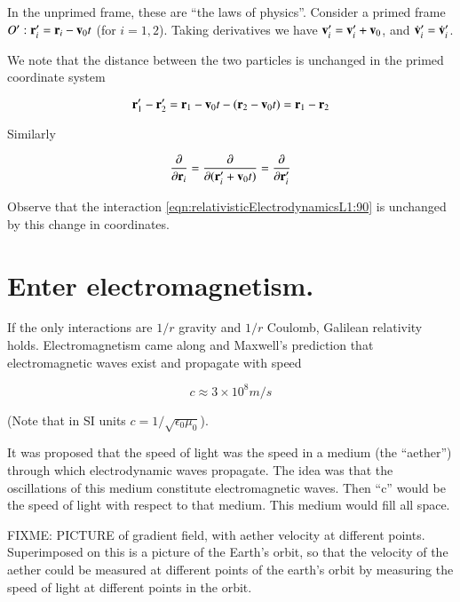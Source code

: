 In the unprimed frame, these are ``the laws of physics''.  Consider a primed frame $O' : \mathbf{r}_i' = \mathbf{r}_i - \mathbf{v}_0 t$ (for $i=1,2$).  Taking derivatives we have $\mathbf{v}_i' = \mathbf{v}_i' + \mathbf{v}_0$, and $\dot{\mathbf{v}}_i' = \dot{\mathbf{v}}_i'$.

We note that the distance between the two particles is unchanged in the primed coordinate system

\begin{equation}\label{eqn:relativisticElectrodynamicsL1:100}
\mathbf{r}_1' - \mathbf{r}_2' = \mathbf{r}_1 - \mathbf{v}_0 t -( \mathbf{r}_2 - \mathbf{v}_0 t ) = \mathbf{r}_1 - \mathbf{r}_2
\end{equation}

Similarly 

\begin{equation}\label{eqn:relativisticElectrodynamicsL1:110}
\frac{\partial {}}{\partial {\mathbf{r}_i}} = \frac{\partial {}}{\partial {(\mathbf{r}_i' + \mathbf{v}_0 t)}} = \frac{\partial {}}{\partial {\mathbf{r}_i'}}
\end{equation}

Observe that the interaction \ref{eqn:relativisticElectrodynamicsL1:90} is unchanged by this change in coordinates.

\section{Enter electromagnetism.}


If the only interactions are $1/r$ gravity and $1/r$ Coulomb, Galilean relativity holds.  Electromagnetism came along and Maxwell's prediction that electromagnetic waves exist and propagate with speed

\begin{equation}\label{eqn:relativisticElectrodynamicsL1:200}
c \approx 3 \times 10^8 m/s
\end{equation}

(Note that in SI units $c = 1/\sqrt{ \epsilon_0 \mu_0 }$).

It was proposed that the speed of light was the speed in a medium (the ``aether'') through which electrodynamic waves propagate.  The idea was that the oscillations of this medium constitute electromagnetic waves.  Then ``c'' would be the speed of light with respect to that medium.  This medium would fill all space.

FIXME: PICTURE of gradient field, with aether velocity at different points.  Superimposed on this is a picture of the Earth's orbit, so that the velocity of the aether could be measured at different points of the earth's orbit by measuring the speed of light at different points in the orbit.

